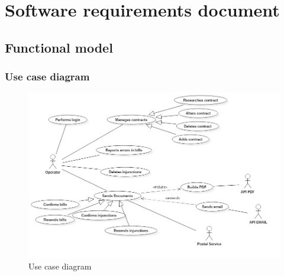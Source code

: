 \section{Software requirements document}{
	\subsection{Functional model}{
		\subsubsection{Use case diagram}{
			\begin{figure}[htbp]
				\begin{center}
					\includegraphics[width=15cm]{images/UseCaseDiagram.jpg}
				\end{center}
				\caption{Use case diagram}
			\end{figure}
		}
		\clearpage
}}
